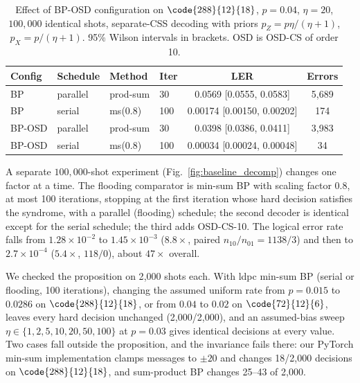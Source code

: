 
\begin{table}[t]
\centering
\caption{Effect of BP-OSD configuration on $\code{288}{12}{18}$, $p=0.04$,
         $\eta=20$, $100{,}000$ identical shots, separate-CSS decoding with
         priors $p_Z=p\eta/(\eta+1)$, $p_X=p/(\eta+1)$. 95\% Wilson intervals
         in brackets. OSD is OSD-CS of order 10.}
\label{tab:smoking_gun}
\begin{tabular}{@{}llllcc@{}}
\toprule
Config & Schedule & Method & Iter & LER & Errors \\
\midrule
BP              & parallel & prod-sum & 30  & 0.0569 [0.0555, 0.0583] & 5{,}689 \\
BP              & serial   & ms(0.8)  & 100 & 0.00174 [0.00150, 0.00202] & 174 \\
BP-OSD          & parallel & prod-sum & 30  & 0.0398 [0.0386, 0.0411] & 3{,}983 \\
BP-OSD          & serial   & ms(0.8)  & 100 & 0.00034 [0.00024, 0.00048] & 34 \\
\bottomrule
\end{tabular}
\end{table}

A separate $100{,}000$-shot experiment (Fig.~\ref{fig:baseline_decomp})
changes one factor at a time. The flooding comparator is min-sum BP with
scaling factor $0.8$, at most 100 iterations, stopping at the first
iteration whose hard decision satisfies the syndrome, with a parallel
(flooding) schedule; the second decoder is identical except for the serial
schedule; the third adds OSD-CS-10. The logical error rate falls from
$1.28\times10^{-2}$ to $1.45\times10^{-3}$ ($8.8\times$, paired
$n_{10}/n_{01}=1138/3$) and then to $2.7\times10^{-4}$ ($5.4\times$,
$118/0$), about $47\times$ overall.

We checked the proposition on 2{,}000 shots each. With ldpc min-sum BP
(serial or flooding, 100 iterations), changing the assumed uniform rate
from $p=0.015$ to $0.0286$ on $\code{288}{12}{18}$, or from $0.04$ to
$0.02$ on $\code{72}{12}{6}$, leaves every hard decision unchanged
(2{,}000/2{,}000), and an assumed-bias sweep
$\eta\in\{1,2,5,10,20,50,100\}$ at $p=0.03$ gives identical decisions at
every value. Two cases fall outside the proposition, and the invariance
fails there: our PyTorch min-sum implementation clamps messages to
$\pm20$ and changes 18/2{,}000 decisions on $\code{288}{12}{18}$, and
sum-product BP changes 25--43 of 2{,}000.

